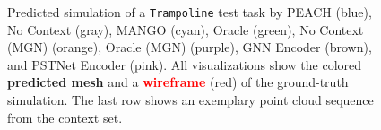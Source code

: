 \begin{figure}[p]
    \caption{
Predicted simulation of a \texttt{Trampoline} test task by
\textcolor{TabBlue}{PEACH} (blue),
\textcolor{TabGray}{No Context} (gray),
\textcolor{TabCyan}{MANGO} (cyan),
\textcolor{TabGreen}{Oracle} (green),
\textcolor{TabOrange}{No Context (MGN)} (orange),
\textcolor{TabPurple}{Oracle (MGN)} (purple),
\textcolor{TabBrown}{GNN Encoder} (brown), and
\textcolor{TabPink}{PSTNet Encoder} (pink).
All visualizations show the colored \textbf{predicted mesh} and a \textbf{\textcolor{red}{wireframe}} (red) of the ground-truth simulation. The last row shows an exemplary point cloud sequence from the context set.
    }
    \label{fig:qualitative_trajectories_trampoline}
\end{figure}